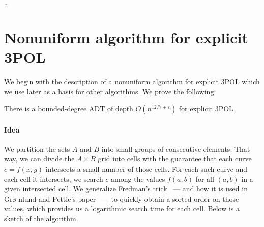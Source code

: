 \documentclass{article}
\newcounter{algorithm}[section]
\begin{document}
\dots

\section{Nonuniform algorithm for explicit 3POL}%
\label{sec:algo:explicit:nonuniform}

We begin with the description of a nonuniform algorithm for explicit 3POL which
we use later as a basis for other algorithms. We prove the following:
\begin{theorem}\label{thm:explicit:act}
	There is a bounded-degree ADT of depth
	$O(n^{12/7+\varepsilon})$
	for explicit 3POL\@.
\end{theorem}

\paragraph{Idea}
We partition the sets $A$ and $B$ into small groups of consecutive
elements. That way, we can divide the $A\times B$ grid into cells with the
guarantee that each curve $c = f(x,y)$ intersects a small number
of those cells. For each such curve and each cell it intersects, we
search $c$ among the values $f(a,b)$ for all $(a,b)$ in a given intersected
cell. We generalize Fredman's trick~\cite{F76} --- and how it is used in Gr\o
nlund and Pettie's paper~\cite{GP14} --- to quickly obtain a sorted order on
those values, which provides us a logarithmic search time for each cell.
Below is a sketch of the algorithm.
\end{document}
